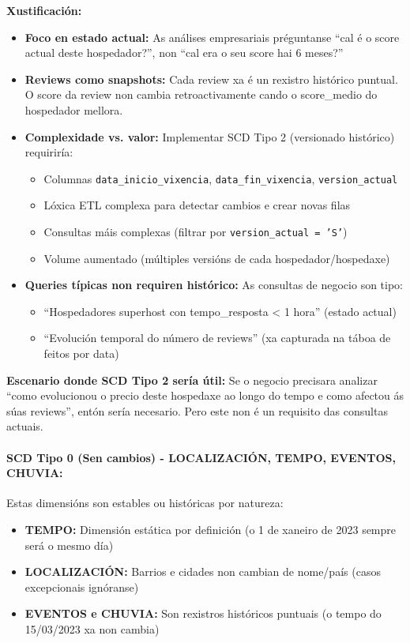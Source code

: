 \documentclass[12pt,a4paper]{article}
\begin{document}
\textbf{Xustificación:}
\begin{itemize}
    \item \textbf{Foco en estado actual:} As análises empresariais préguntanse ``cal é o score actual deste hospedador?'', non ``cal era o seu score hai 6 meses?''
    \item \textbf{Reviews como snapshots:} Cada review xa é un rexistro histórico puntual. O score da review non cambia retroactivamente cando o score\_medio do hospedador mellora.
    \item \textbf{Complexidade vs. valor:} Implementar SCD Tipo 2 (versionado histórico) requiriría:
        \begin{itemize}
            \item Columnas \texttt{data\_inicio\_vixencia}, \texttt{data\_fin\_vixencia}, \texttt{version\_actual}
            \item Lóxica ETL complexa para detectar cambios e crear novas filas
            \item Consultas máis complexas (filtrar por \texttt{version\_actual = 'S'})
            \item Volume aumentado (múltiples versións de cada hospedador/hospedaxe)
        \end{itemize}
    \item \textbf{Queries típicas non requiren histórico:} As consultas de negocio son tipo:
        \begin{itemize}
            \item ``Hospedadores superhost con tempo\_resposta < 1 hora'' (estado actual)
            \item ``Evolución temporal do número de reviews'' (xa capturada na táboa de feitos por data)
        \end{itemize}
\end{itemize}

\textbf{Escenario donde SCD Tipo 2 sería útil:}
Se o negocio precisara analizar ``como evolucionou o precio deste hospedaxe ao longo do tempo e como afectou ás súas reviews'', entón sería necesario. Pero este non é un requisito das consultas actuais.

\paragraph{SCD Tipo 0 (Sen cambios) - LOCALIZACIÓN, TEMPO, EVENTOS, CHUVIA:}

Estas dimensións son estables ou históricas por natureza:
\begin{itemize}
    \item \textbf{TEMPO:} Dimensión estática por definición (o 1 de xaneiro de 2023 sempre será o mesmo día)
    \item \textbf{LOCALIZACIÓN:} Barrios e cidades non cambian de nome/país (casos excepcionais ignóranse)
    \item \textbf{EVENTOS e CHUVIA:} Son rexistros históricos puntuais (o tempo do 15/03/2023 xa non cambia)
\end{itemize}
\end{document}
